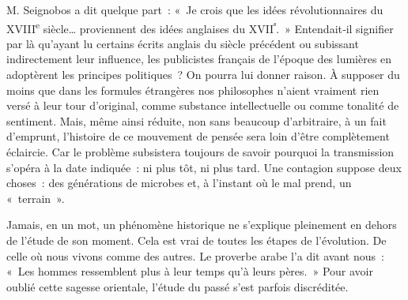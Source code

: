 \documentclass[french,twoside]{book} %
\begin{document}
M. Seignobos a dit quelque part : « Je crois que les idées révolutionnaires du XVIII\textsuperscript{e} siècle… proviennent des idées anglaises du XVII\textsuperscript{ᵉ}. » Enten­dait‑il signifier par là qu’ayant lu certains écrits anglais du siècle précédent ou subissant indirectement leur influence, les publicistes français de l’époque des lumières en adoptèrent les principes politiques ? On pourra lui donner raison. À supposer du moins que dans les formules étrangères nos philosophes n’aient vraiment rien versé à leur tour d’original, comme substance intellectuelle ou comme tonalité de sentiment. Mais, même ainsi réduite, non sans beaucoup d’arbitraire, à un fait d’emprunt, l’histoire de ce mouvement de pensée sera loin d’être complètement éclaircie. Car  
\label{p9} le problème subsistera toujours de savoir pourquoi la transmission s’opéra à la date indiquée : ni plus tôt, ni plus tard. Une contagion suppose deux choses : des générations de microbes et, à l’instant où le mal prend, un « terrain ».\par
Jamais, en un mot, un phénomène historique ne s’explique pleinement en dehors de l’étude de son moment. Cela est vrai de toutes les étapes de l’évolution. De celle où nous vivons comme des autres. Le proverbe arabe l’a dit avant nous : « Les hommes ressemblent plus à leur temps qu’à leurs pères. » Pour avoir oublié cette sagesse orientale, l’étude du passé s’est parfois discréditée.
\end{document}
